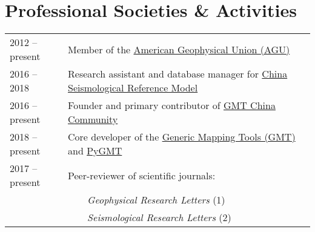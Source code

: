 \section*{Professional Societies \& Activities}

\newcommand{\tabitem}{~~\llap{\textbullet}~~}

\begin{tabular}{ll}
2012 -- present & Member of the \href{https://sites.agu.org/}{American Geophysical Union (AGU)} \\
2016 -- 2018    & Research assistant and database manager for \href{http://chinageorefmodel.org/}{China Seismological Reference Model} \\
2016 -- present & Founder and primary contributor of \href{http://gmt-china.org/}{GMT China Community} \\
2018 -- present & Core developer of the \href{https://github.com/GenericMappingTools/gmt}{Generic Mapping Tools (GMT)} and \href{https://github.com/GenericMappingTools/pygmt}{PyGMT} \\
2017 -- present & Peer-reviewer of scientific journals: \\
                & \tabitem \textit{Geophysical Research Letters} (1) \\
                & \tabitem \textit{Seismological Research Letters} (2) \\
\end{tabular}
